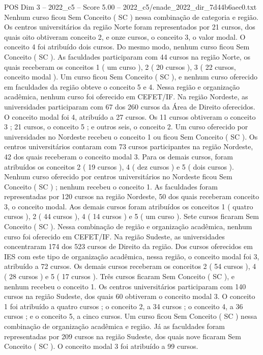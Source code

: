 \begin{textsample}{POS Dim 3 – 2022\_c5 – Score 5.00 – 2022\_c5/enade\_2022\_dir\_7d44b6aec0.txt}
Nenhum curso ficou Sem Conceito ( SC ) nessa combinação de categoria e região.
Os centros universitários da região Norte foram representados por 21 cursos, dos quais oito obtiveram conceito 2, e onze cursos, o conceito 3, o valor modal.
O conceito 4 foi atribuído dois cursos.
Do mesmo modo, nenhum curso ficou Sem Conceito ( SC ).
As faculdades participaram com 44 cursos na região Norte, os quais receberam os conceitos 1 ( um curso ), 2 ( 20 cursos ), 3 ( 22 cursos, conceito modal ).
Um curso ficou Sem Conceito ( SC ), e nenhum curso oferecido em faculdades da região obteve o conceito 5 e 4.
Nessa região e organização acadêmica, nenhum curso foi oferecido em CEFET/IF.
Na região Nordeste, as universidades participaram com 67 dos 260 cursos da Área de Direito oferecidos.
O conceito modal foi 4, atribuído a 27 cursos.
Os 11 cursos obtiveram o conceito 3 ; 21 cursos, o conceito 5 ; e outros seis, o conceito 2.
Um curso oferecido por universidades no Nordeste recebeu o conceito 1 ou ficou Sem Conceito ( SC ).
Os centros universitários contaram com 73 cursos participantes na região Nordeste, 42 dos quais receberam o conceito modal 3.
Para os demais cursos, foram atribuídos os conceitos 2 ( 19 cursos ), 4 ( dez cursos ) e 5 ( dois cursos ).
Nenhum curso oferecido por centros universitários no Nordeste ficou Sem Conceito ( SC ) ; nenhum recebeu o conceito 1.
As faculdades foram representadas por 120 cursos na região Nordeste, 50 dos quais receberam conceito 3, o conceito modal.
Aos demais cursos foram atribuídos os conceitos 1 ( quatro cursos ), 2 ( 44 cursos ), 4 ( 14 cursos ) e 5 ( um curso ).
Sete cursos ficaram Sem Conceito ( SC ).
Nessa combinação de região e organização acadêmica, nenhum curso foi oferecido em CEFET/IF.
Na região Sudeste, as universidades concentraram 174 dos 523 cursos de Direito da região.
Dos cursos oferecidos em IES com este tipo de organização acadêmica, nessa região, o conceito modal foi 3, atribuído a 72 cursos.
Os demais cursos receberam os conceitos 2 ( 54 cursos ), 4 ( 28 cursos ) e 5 ( 17 cursos ).
Três cursos ficaram Sem Conceito ( SC ), e nenhum recebeu o conceito 1.
Os centros universitários participaram com 140 cursos na região Sudeste, dos quais 60 obtiveram o conceito modal 3.
O conceito 1 foi atribuído a quatro cursos ; o conceito 2, a 34 cursos ; o conceito 4, a 36 cursos ; e o conceito 5, a cinco cursos.
Um curso ficou Sem Conceito ( SC ) nessa combinação de organização acadêmica e região.
Já as faculdades foram representadas por 209 cursos na região Sudeste, dos quais nove ficaram Sem Conceito ( SC ).
O conceito modal 3 foi atribuído a 99 cursos.

\end{textsample}

